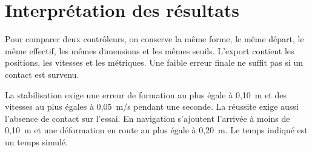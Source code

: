 \section*{Interprétation des résultats}
Pour comparer deux contrôleurs, on conserve la même forme, le même départ, le même effectif, les mêmes dimensions et les mêmes seuils. L'export contient les positions, les vitesses et les métriques. Une faible erreur finale ne suffit pas si un contact est survenu.

La stabilisation exige une erreur de formation au plus égale à 0,10~m et des vitesses au plus égales à 0,05~m/s pendant une seconde. La réussite exige aussi l'absence de contact sur l'essai. En navigation s'ajoutent l'arrivée à moins de 0,10~m et une déformation en route au plus égale à 0,20~m. Le temps indiqué est un temps simulé.
